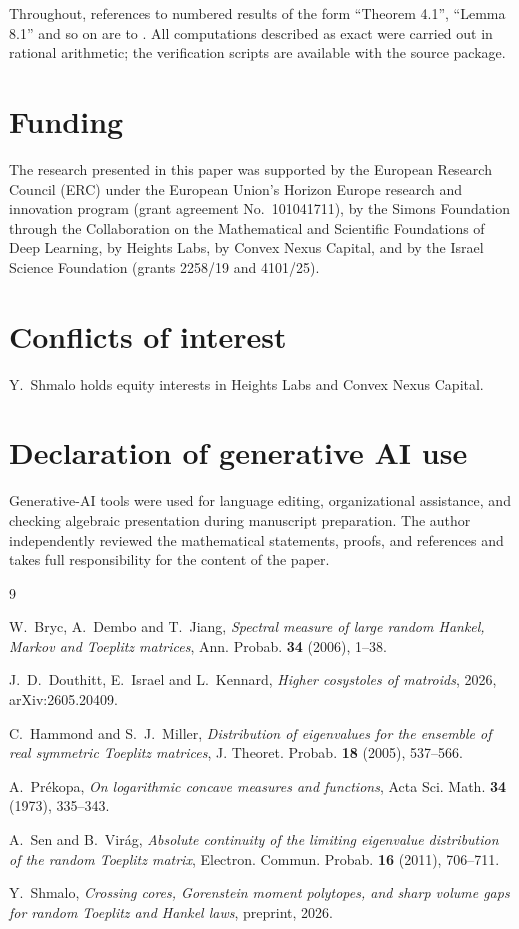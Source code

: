 \documentclass[11pt,reqno]{amsart}
\theoremstyle{plain}
\theoremstyle{remark}
\begin{document}
Throughout, references to numbered results of the form ``Theorem 4.1'',
``Lemma 8.1'' and so on are to \cite{Shmalo}.  All computations
described as exact were carried out in rational arithmetic; the
verification scripts are available with the source package.



\section*{Funding}
The research presented in this paper was supported by the European
Research Council (ERC) under the European Union's Horizon Europe research
and innovation program (grant agreement No.~101041711), by the Simons
Foundation through the Collaboration on the Mathematical and Scientific
Foundations of Deep Learning, by Heights Labs, by Convex Nexus Capital,
and by the Israel Science Foundation (grants 2258/19 and 4101/25).

\section*{Conflicts of interest}
Y.~Shmalo holds equity interests in Heights Labs and Convex Nexus
Capital.

\section*{Declaration of generative AI use}
Generative-AI tools were used for language editing, organizational
assistance, and checking algebraic presentation during manuscript
preparation.  The author independently reviewed the mathematical
statements, proofs, and references and takes full responsibility for the
content of the paper.

\begin{thebibliography}{9}

W.~Bryc, A.~Dembo and T.~Jiang,
\emph{Spectral measure of large random Hankel, Markov and Toeplitz
matrices},
Ann. Probab. \textbf{34} (2006), 1--38.

J.~D.~Douthitt, E.~Israel and L.~Kennard,
\emph{Higher cosystoles of matroids}, 2026, arXiv:2605.20409.

C.~Hammond and S.~J.~Miller,
\emph{Distribution of eigenvalues for the ensemble of real symmetric
Toeplitz matrices},
J. Theoret. Probab. \textbf{18} (2005), 537--566.

A.~Pr\'ekopa,
\emph{On logarithmic concave measures and functions},
Acta Sci. Math. \textbf{34} (1973), 335--343.

A.~Sen and B.~Vir\'ag,
\emph{Absolute continuity of the limiting eigenvalue distribution of the
random Toeplitz matrix},
Electron. Commun. Probab. \textbf{16} (2011), 706--711.

Y.~Shmalo,
\emph{Crossing cores, Gorenstein moment polytopes, and sharp volume gaps
for random Toeplitz and Hankel laws}, preprint, 2026.

\end{thebibliography}
\end{document}
